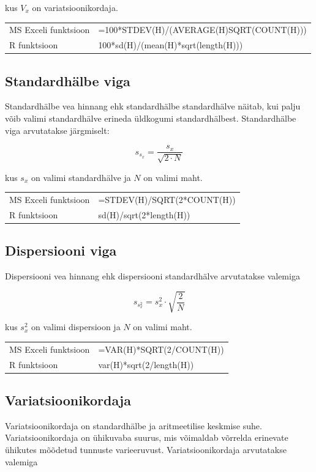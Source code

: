 \documentclass[
]{book}
\begin{document}
kus \(V_x\) on variatsioonikordaja.

\begin{tabular}{ll}
MS Exceli funktsioon & =100*STDEV(H)/(AVERAGE(H)\*SQRT(COUNT(H))) \\
R funktsioon & 100*sd(H)/(mean(H)*sqrt(length(H))) \\
\end{tabular}

\subsection{Standardhälbe viga}\label{standardhuxe4lbe-viga}

Standardhälbe vea hinnang ehk standardhälbe standardhälve näitab, kui palju võib valimi standardhälve erineda üldkogumi standardhälbest. Standardhälbe viga arvutatakse järgmiselt:

\[s_{s_x} = \frac{s_x}{\sqrt{2 \cdot N}}\]

kus \(s_x\) on valimi standardhälve ja \(N\) on valimi maht.

\begin{tabular}{ll}
MS Exceli funktsioon & =STDEV(H)/SQRT(2*COUNT(H)) \\
R funktsioon & sd(H)/sqrt(2*length(H)) \\
\end{tabular}

\subsection{Dispersiooni viga}\label{dispersiooni-viga}

Dispersiooni vea hinnang ehk dispersiooni standardhälve arvutatakse valemiga

\[s_{s_x^2} = s_x^2 \cdot \sqrt{\frac{2}{N}}\]

kus \(s_x^2\) on valimi dispersioon ja \(N\) on valimi maht.

\begin{tabular}{ll}
MS Exceli funktsioon & =VAR(H)*SQRT(2/COUNT(H)) \\
R funktsioon & var(H)*sqrt(2/length(H))
\end{tabular}

\subsection{Variatsioonikordaja}\label{variatsioonikordaja}

Variatsioonikordaja on standardhälbe ja aritmeetilise keskmise suhe. Variatsioonikordaja on ühikuvaba suurus, mis võimaldab võrrelda erinevate ühikutes mõõdetud tunnuste varieeruvust. Variatsioonikordaja arvutatakse valemiga
\end{document}

